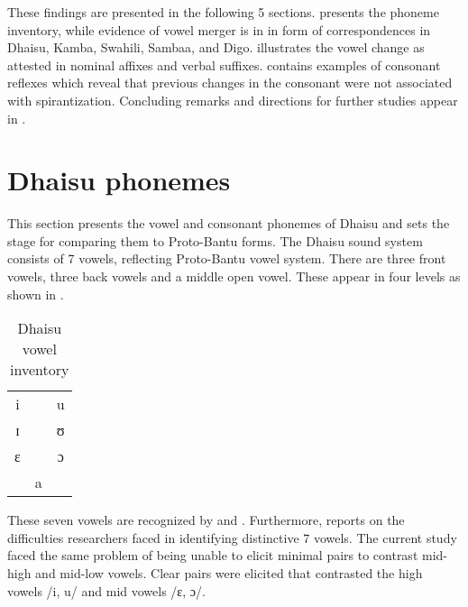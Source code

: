 \documentclass[output=paper,colorlinks,citecolor=brown]{langscibook}
\begin{document}
These findings are presented in the following 5 sections.  presents the phoneme inventory, while evidence of vowel merger is in  in form of correspondences in Dhaisu, Kamba, Swahili, Sambaa, and Digo.  illustrates the vowel change as attested in nominal affixes and verbal suffixes.  contains examples of consonant reflexes which reveal that previous changes in the consonant were not associated with spirantization. Concluding remarks and directions for further studies appear in .

\section{Dhaisu phonemes}\label{sec:ngonyani:2}

This section presents the vowel and consonant phonemes of Dhaisu and sets the stage for comparing them to Proto-Bantu forms. The Dhaisu sound system consists of 7 vowels, reflecting Proto-Bantu vowel system. There are three front vowels, three back vowels and a middle open vowel. These appear in four levels 
as shown in .


\begin{table}
	\caption{Dhaisu vowel inventory \citep[4]{RugemaliraEtAl2019}}
    \label{tab:ngonyani:1}
    \begin{tabular}{ccc}
        i   &     & u\\
        ɪ   &     & ʊ\\
        ɛ   &     & ɔ\\
            & a   & \\
    \end{tabular}
\end{table}


These seven vowels are recognized by \cite{Nurse2000}  and \cite{RugemaliraEtAl2019}. Furthermore, \cite[20]{Nurse2000} reports on the difficulties researchers faced in identifying distinctive 7 vowels. The current study faced the same problem of being unable to elicit minimal pairs to contrast mid-high and mid-low vowels. Clear pairs were elicited that contrasted the high vowels /i, u/ and mid vowels /ɛ, ɔ/.
\end{document}
